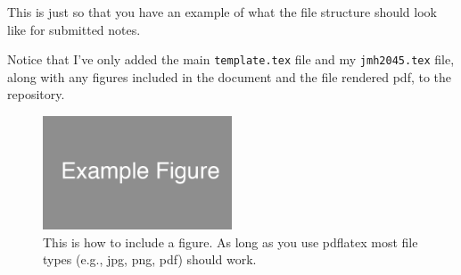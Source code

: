 
This is just so that you have an example of what the file structure should look like for submitted notes.

Notice that I've only added the main \texttt{template.tex} file and my \texttt{jmh2045.tex} file, along with any figures included in the document and the file rendered pdf, to the repository.

\begin{figure}[ht]
  \begin{center}
    \includegraphics[width=0.5\textwidth]{figures/example_figure.png}
    \caption{
      This is how to include a figure.
      As long as you use pdflatex most file types (e.g., jpg, png, pdf) should work.}
    \label{fig:example_figure}
  \end{center}
\end{figure}

